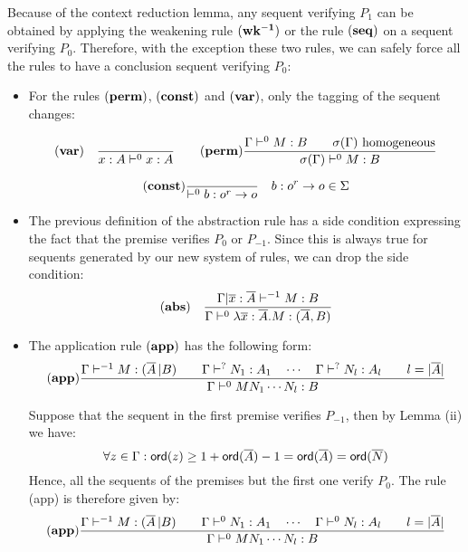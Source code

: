 Because of the context reduction lemma, any sequent verifying $P_1$ can be obtained
by applying the weakening rule $\mathbf{(wk^{-1})}$ or the rule $\mathbf{(seq)}$ on a sequent
verifying $P_0$. Therefore, with the exception these two rules, we can safely force all the rules to
have a conclusion sequent verifying $P_0$:
\begin{itemize}
\item  For the rules $\mathbf{(perm)}$, $\mathbf{(const)}$ and $\mathbf{(var)}$, only the tagging of the sequent changes:

$$ \mathbf{(var)} \quad  \frac{\displaystyle }{x : A\vdash^{0} x : A}
\qquad
  \mathbf{(perm)} {
      { \Gamma \vdash^0 M:B \qquad \sigma(\Gamma)  } \hbox{ homogeneous}
    \over
      { \sigma(\Gamma) \vdash^0 M : B }
    }
$$

$$ \mathbf{(const)}
    { \over { \vdash^0 b : o^r \rightarrow o}} \quad b : o^r \rightarrow o \in \Sigma
$$

\item  The previous definition of the abstraction rule has a side condition
expressing the fact that the premise verifies $P_0$ or $P_{-1}$. Since this is always true for sequents
generated by our new system of rules, we can drop the side condition:
$$ \mathbf{(abs)} \quad  \frac{\displaystyle \Gamma | \overline{x} : \overline{A} \vdash^{-1} M : B}{\Gamma  \vdash^{0} \lambda \overline{x} : \overline{A} . M : (\overline{A},B)}$$


\item The application rule $\mathbf{(app)}$ has the following form:
$$ \mathbf{(app)}
    {
        { \Gamma \vdash^{-1} M : (\overline{A} \, | B)
        \qquad
        \Gamma \vdash^? N_1 : A_1 \quad \cdots \quad \Gamma \vdash^? N_{l} : A_l \qquad l = |\overline{A}|
        }
    \over{
        \Gamma \vdash^0 M N_1 \cdots N_{l} : B
       }
    }
$$

Suppose that the sequent in the first premise verifies $P_{-1}$, then by Lemma \label{lem:safe_basic_prop}(ii)
we have:
$$\forall z \in \Gamma : {\sf ord}(z) \geq 1 + {\sf ord}(\overline{A}) -1 = {\sf ord}(\overline{A}) = {\sf ord}(\overline{N})$$
Hence, all the sequents of the premises but the first one verify $P_0$. The rule (app) is therefore given by:
$$ \mathbf{(app)}
    {
        { \Gamma \vdash^{-1} M : (\overline{A} \, | B)
        \qquad
        \Gamma \vdash^0 N_1 : A_1 \quad \cdots \quad \Gamma \vdash^0 N_{l} : A_l \qquad l = |\overline{A}|
        }
    \over{
        \Gamma \vdash^0 M N_1 \cdots N_{l} : B
       }
    }
$$


\end{itemize}
